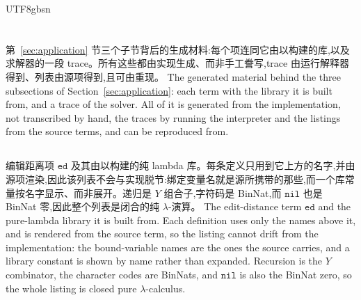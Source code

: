 \begin{CJK*}{UTF8}{gbsn}
  \section{}\label{app:examples}
  \ifPaperChinese
  第~\ref{sec:application} 节三个子节背后的生成材料:每个项连同它由以构建的库,以及求解器的一段 trace。所有这些都由实现生成、而非手工誊写,trace 由运行解释器得到、列表由源项得到,且可由重现。
  \else
  The generated material behind the three subsections of Section~\ref{sec:application}: each term with the library it is built from, and a trace of the solver. All of it is generated from the implementation, not transcribed by hand, the traces by running the interpreter and the listings from the source terms, and can be reproduced from.
  \fi

  \subsection{}\label{app:editdistance-code}
  \ifPaperChinese
  编辑距离项 $\mathtt{ed}$ 及其由以构建的纯 lambda 库。每条定义只用到它上方的名字,并由源项渲染,因此该列表不会与实现脱节:绑定变量名就是源所携带的那些,而一个库常量按名字显示、而非展开。递归是 $Y$ 组合子,字符码是 BinNat,而 $\mathtt{nil}$ 也是 BinNat 零,因此整个列表是闭合的纯 $\lambda$-演算。
  \else
  The edit-distance term $\mathtt{ed}$ and the pure-lambda library it is built from. Each definition uses only the names above it, and is rendered from the source term, so the listing cannot drift from the implementation: the bound-variable names are the ones the source carries, and a library constant is shown by name rather than expanded. Recursion is the $Y$ combinator, the character codes are BinNats, and $\mathtt{nil}$ is also the BinNat zero, so the whole listing is closed pure $\lambda$-calculus.
  \fi
  


\end{CJK*}
